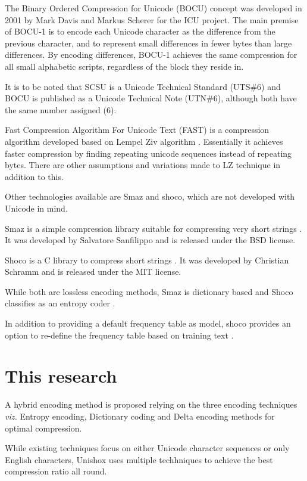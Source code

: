 \documentclass[]{article}
\begin{document}
The Binary Ordered Compression for Unicode (BOCU) concept was developed in 2001 by Mark Davis and Markus Scherer for the ICU project. The main premise of BOCU-1 is to encode each Unicode character as the difference from the previous character, and to represent small differences in fewer bytes than large differences. By encoding differences, BOCU-1 achieves the same compression for all small alphabetic scripts, regardless of the block they reside in. \cite{11} \cite{13}

It is to be noted that SCSU is a Unicode Technical Standard (UTS\#6) and BOCU is published as a Unicode Technical Note (UTN\#6), although both have the same number assigned (6).

Fast Compression Algorithm For Unicode Text (FAST) is a compression algorithm developed based on Lempel Ziv algorithm \cite{4}. Essentially it achieves faster compression by finding repeating unicode sequences instead of repeating bytes. There are other assumptions and variations made to LZ technique in addition to this. \cite{12}

Other technologies available are Smaz and shoco, which are not developed with Unicode in mind.

Smaz is a simple compression library suitable for compressing very short strings \cite{14}. It was developed by Salvatore Sanfilippo and is released under the BSD license.

Shoco is a C library to compress short strings \cite{15}. It was developed by Christian Schramm and is released under the MIT license.

While both are lossless encoding methods, Smaz is dictionary based and Shoco classifies as an entropy coder \cite{15}.

In addition to providing a default frequency table as model, shoco provides an option to re-define the frequency table based on training text \cite{15}.

\section{This research}

A hybrid encoding method is proposed relying on the three encoding techniques \emph{viz.} Entropy encoding, Dictionary coding and Delta encoding methods for optimal compression.

While existing techniques focus on either Unicode character sequences or only English characters, Unishox uses multiple techhniques to achieve the best compression ratio all round.
\end{document}
